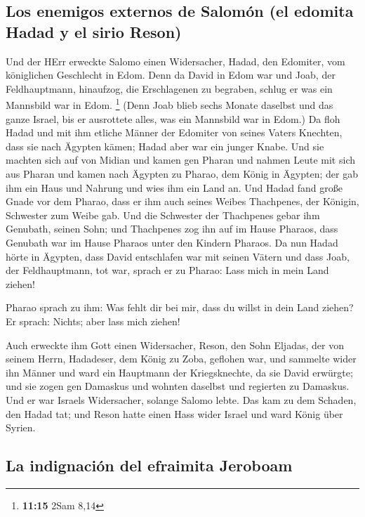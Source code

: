 \hypertarget{los-enemigos-externos-de-salomuxf3n-el-edomita-hadad-y-el-sirio-reson}{%
\subsection{Los enemigos externos de Salomón (el edomita Hadad y el
sirio
Reson)}\label{los-enemigos-externos-de-salomuxf3n-el-edomita-hadad-y-el-sirio-reson}}

 Und der HErr erweckte Salomo einen Widersacher, Hadad,
den Edomiter, vom königlichen Geschlecht in Edom.  Denn
da David in Edom war und Joab, der Feldhauptmann, hinaufzog, die
Erschlagenen zu begraben, schlug er was ein Mannsbild war in Edom.
\footnote{\textbf{11:15} 2Sam 8,14}  (Denn Joab blieb
sechs Monate daselbst und das ganze Israel, bis er ausrottete alles, was
ein Mannsbild war in Edom.)  Da floh Hadad und mit ihm
etliche Männer der Edomiter von seines Vaters Knechten, dass sie nach
Ägypten kämen; Hadad aber war ein junger Knabe.  Und sie
machten sich auf von Midian und kamen gen Pharan und nahmen Leute mit
sich aus Pharan und kamen nach Ägypten zu Pharao, dem König in Ägypten;
der gab ihm ein Haus und Nahrung und wies ihm ein Land an.
 Und Hadad fand große Gnade vor dem Pharao, dass er ihm
auch seines Weibes Thachpenes, der Königin, Schwester zum Weibe gab.
 Und die Schwester der Thachpenes gebar ihm Genubath,
seinen Sohn; und Thachpenes zog ihn auf im Hause Pharaos, dass Genubath
war im Hause Pharaos unter den Kindern Pharaos.  Da nun
Hadad hörte in Ägypten, dass David entschlafen war mit seinen Vätern und
dass Joab, der Feldhauptmann, tot war, sprach er zu Pharao: Lass mich in
mein Land ziehen!

 Pharao sprach zu ihm: Was fehlt dir bei mir, dass du
willst in dein Land ziehen? Er sprach: Nichts; aber lass mich ziehen!

 Auch erweckte ihm Gott einen Widersacher, Reson, den
Sohn Eljadas, der von seinem Herrn, Hadadeser, dem König zu Zoba,
geflohen war,  und sammelte wider ihn Männer und ward ein
Hauptmann der Kriegsknechte, da sie David erwürgte; und sie zogen gen
Damaskus und wohnten daselbst und regierten zu Damaskus. 
Und er war Israels Widersacher, solange Salomo lebte. Das kam zu dem
Schaden, den Hadad tat; und Reson hatte einen Hass wider Israel und ward
König über Syrien.

\hypertarget{la-indignaciuxf3n-del-efraimita-jeroboam}{%
\subsection{La indignación del efraimita
Jeroboam}\label{la-indignaciuxf3n-del-efraimita-jeroboam}}

